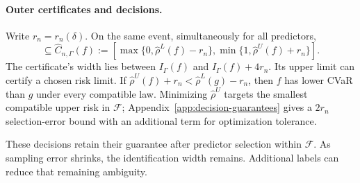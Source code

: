 \paragraph{Outer certificates and decisions.}\label{cor:certificate}
Write \(r_n=r_n(\delta)\). On the same event, simultaneously for all predictors,
\begin{equation}
 [\underline\rho_{\alpha,\Gamma}(f),\overline\rho_{\alpha,\Gamma}(f)]
 \subseteq
 \widehat C_{n,\Gamma}(f)
 :=
 [\max\{0,\widehat\rho^L(f)-r_n\},
  \min\{1,\widehat\rho^U(f)+r_n\}].
\label{eq:outer-certificate}
\end{equation}
The certificate's width lies between \(I_\Gamma(f)\) and \(I_\Gamma(f)+4r_n\). Its upper limit can certify a chosen risk limit. If \(\widehat\rho^U(f)+r_n<\widehat\rho^L(g)-r_n\), then \(f\) has lower CVaR than \(g\) under every compatible law. Minimizing \(\widehat\rho^U\) targets the smallest compatible upper risk in \(\mathcal F\); Appendix~\ref{app:decision-guarantees} gives a \(2r_n\) selection-error bound with an additional term for optimization tolerance.

These decisions retain their guarantee after predictor selection within \(\mathcal F\). As sampling
error shrinks, the identification width remains. Additional labels can reduce that remaining
ambiguity.
